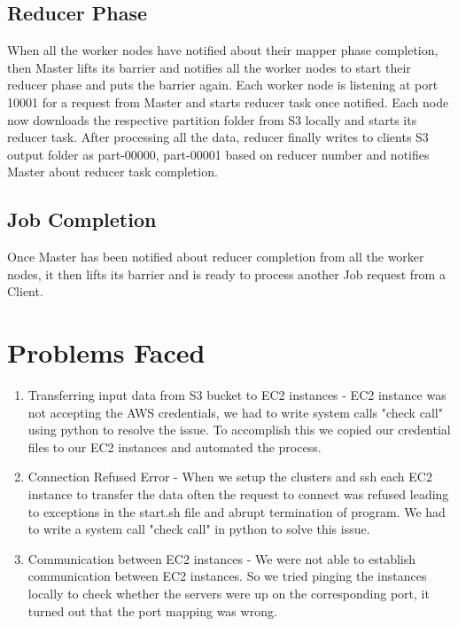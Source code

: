 \documentclass{article}
\begin{document}
\subsection{Reducer Phase}
When all the worker nodes have notified about their mapper phase completion, then Master lifts its barrier and notifies all the worker nodes to start their reducer phase and puts the barrier again. Each worker node is listening at port 10001 for a request from Master and starts reducer task once notified. Each node now downloads the respective partition folder from S3 locally and starts its reducer task. After processing all the data, reducer finally writes to clients S3 output folder as part-00000, part-00001 based on reducer number and notifies Master about reducer task completion.

\subsection{Job Completion}
Once Master has been notified about reducer completion from all the worker nodes, it then lifts its barrier and is ready to process another Job request from a Client. 

\section{Problems Faced}
\begin{enumerate}

    \item Transferring input data from S3 bucket to EC2 instances - EC2 instance was not accepting the AWS credentials, we had to write system calls "check call" using python to resolve the issue. To accomplish this we copied our credential files to our EC2 instances and automated the process.

    \item Connection Refused Error - When we setup the clusters and ssh each EC2 instance to transfer the data often the request to connect was refused leading to exceptions in the start.sh file and abrupt termination of program. We had to write a system call "check call" in python to solve this issue.

    \item Communication between EC2 instances - We were not able to establish communication between EC2 instances. So we tried pinging the instances locally to check whether the servers were up on the corresponding port, it turned out that the port mapping was wrong.

\end{enumerate}
\end{document}
